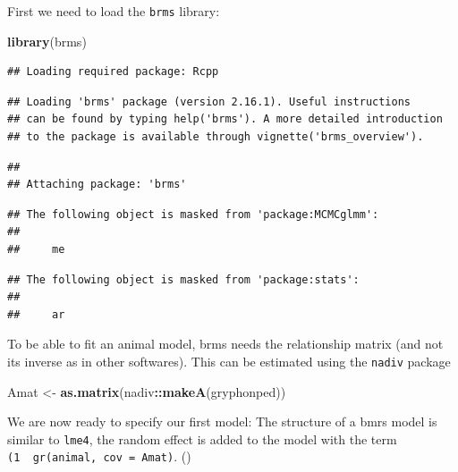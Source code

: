\documentclass[
  12pt,
]{book}
\newenvironment{Shaded}{\begin{snugshade}}{\end{snugshade}}
\newcommand{\KeywordTok}[1]{\textcolor[rgb]{0.13,0.29,0.53}{\textbf{#1}}}
\newcommand{\NormalTok}[1]{#1}
\newcommand{\OperatorTok}[1]{\textcolor[rgb]{0.81,0.36,0.00}{\textbf{#1}}}
\newcommand{\StringTok}[1]{\textcolor[rgb]{0.31,0.60,0.02}{#1}}
\begin{document}
First we need to load the \texttt{brms} library:

\begin{Shaded}
\begin{Highlighting}[]
\KeywordTok{library}\NormalTok{(brms)}
\end{Highlighting}
\end{Shaded}

\begin{verbatim}
## Loading required package: Rcpp
\end{verbatim}

\begin{verbatim}
## Loading 'brms' package (version 2.16.1). Useful instructions
## can be found by typing help('brms'). A more detailed introduction
## to the package is available through vignette('brms_overview').
\end{verbatim}

\begin{verbatim}
## 
## Attaching package: 'brms'
\end{verbatim}

\begin{verbatim}
## The following object is masked from 'package:MCMCglmm':
## 
##     me
\end{verbatim}

\begin{verbatim}
## The following object is masked from 'package:stats':
## 
##     ar
\end{verbatim}

To be able to fit an animal model, brms needs the relationship matrix (and not its inverse as in other softwares).
This can be estimated using the \texttt{nadiv} package

\begin{Shaded}
\begin{Highlighting}[]
\NormalTok{Amat \textless{}{-}}\StringTok{ }\KeywordTok{as.matrix}\NormalTok{(nadiv}\OperatorTok{::}\KeywordTok{makeA}\NormalTok{(gryphonped))}
\end{Highlighting}
\end{Shaded}

We are now ready to specify our first model:
The structure of a bmrs model is similar to \texttt{lme4}, the random effect is added to the model with the term \texttt{(1\ \textbar{}\ gr(animal,\ cov\ =\ Amat)}. ()
\end{document}
